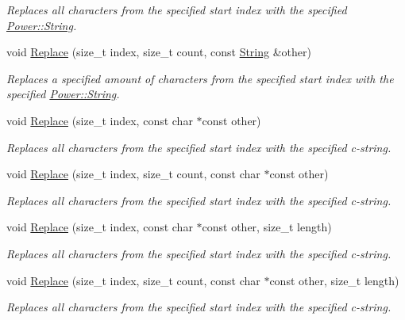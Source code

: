 \begin{DoxyCompactItemize}
\begin{DoxyCompactList}\small\item\em Replaces all characters from the specified start index with the specified \hyperlink{class_power_1_1_string}{Power\+::\+String}. \end{DoxyCompactList}\item 
void \hyperlink{class_power_1_1_string_a2c8234083a3b5b44387ba9712dd85344}{Replace} (size\+\_\+t index, size\+\_\+t count, const \hyperlink{class_power_1_1_string}{String} \&other)
\begin{DoxyCompactList}\small\item\em Replaces a specified amount of characters from the specified start index with the specified \hyperlink{class_power_1_1_string}{Power\+::\+String}. \end{DoxyCompactList}\item 
void \hyperlink{class_power_1_1_string_a662ac2de658f0129ba3e20bbb8841c06}{Replace} (size\+\_\+t index, const char $\ast$const other)
\begin{DoxyCompactList}\small\item\em Replaces all characters from the specified start index with the specified c-\/string. \end{DoxyCompactList}\item 
void \hyperlink{class_power_1_1_string_acbe6e2e31229075c99d1e498a02c8128}{Replace} (size\+\_\+t index, size\+\_\+t count, const char $\ast$const other)
\begin{DoxyCompactList}\small\item\em Replaces all characters from the specified start index with the specified c-\/string. \end{DoxyCompactList}\item 
void \hyperlink{class_power_1_1_string_a7df46dbd4f708f9c758f4b29f77ff1b5}{Replace} (size\+\_\+t index, const char $\ast$const other, size\+\_\+t length)
\begin{DoxyCompactList}\small\item\em Replaces all characters from the specified start index with the specified c-\/string. \end{DoxyCompactList}\item 
void \hyperlink{class_power_1_1_string_a7cb1da79b5e33beb3591a554145aad32}{Replace} (size\+\_\+t index, size\+\_\+t count, const char $\ast$const other, size\+\_\+t length)
\begin{DoxyCompactList}\small\item\em Replaces all characters from the specified start index with the specified c-\/string. \end{DoxyCompactList}\item 

\end{DoxyCompactItemize}
